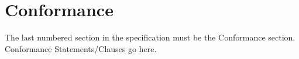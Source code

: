 \chapter{Conformance}

The last numbered section in the specification must be the Conformance section. Conformance Statements/Clauses go here.
